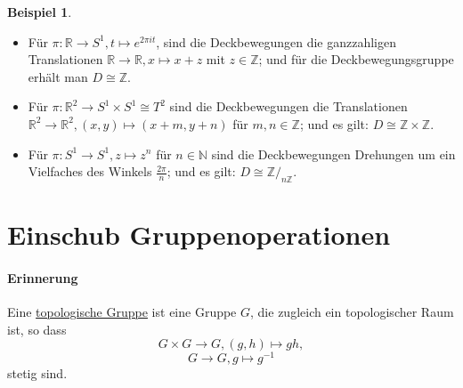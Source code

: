 \documentclass[a4paper,11pt,notitlepage]{report}
\theoremstyle{definition}
\newtheorem{example}{Beispiel}[chapter]
\newcommand{\R}{{\ensuremath{\mathbb{R}}}}
\newcommand{\N}{{\ensuremath{\mathbb{N}}}}
\newcommand{\Z}{{\ensuremath{\mathbb{Z}}}}
\begin{document}
\begin{example}
	\begin{itemize}
		\item Für $\pi \colon \R \rightarrow S^1, t \mapsto e^{2 \pi i t}$, sind die Deckbewegungen die ganzzahligen Translationen $\R \rightarrow \R, x \mapsto x + z$ mit $z \in \Z$; und für die Deckbewegungsgruppe erhält man $D \cong \Z$.
		\item Für $\pi \colon \R^2 \rightarrow S^1 \times S^1 \cong T^2$ sind die Deckbewegungen die Translationen $\R^2 \rightarrow \R^2, (x,y) \mapsto (x+m, y+n)$ für $m,n \in \Z$; und es gilt: $D \cong \Z \times \Z$.
		\item Für $\pi \colon S^1 \rightarrow S^1, z \mapsto z^n$ für $n \in \N$ sind die Deckbewegungen Drehungen um ein Vielfaches des Winkels $\frac{2 \pi}{n}$; und es gilt: $D \cong \Z /_{n \Z}$.
	\end{itemize}
\end{example}

\section{Einschub Gruppenoperationen}
\paragraph{Erinnerung}
Eine \underline{topologische Gruppe} ist eine Gruppe $G$, die zugleich ein topologischer Raum ist, so dass
$$G \times G \rightarrow G, (g,h) \mapsto gh,$$
$$G \rightarrow G, g \mapsto g^{-1}$$
stetig sind.
\end{document}
